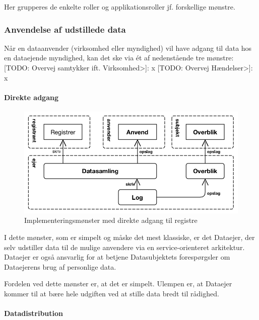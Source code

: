 Her grupperes de enkelte roller og applikationsroller jf. forskellige
mønstre.

\subsubsection{Anvendelse af udstillede
data}\label{anvendelse-af-udstillede-data}

Når en dataanvender (virksomhed eller myndighed) vil have adgang til
data hos en dataejende myndighed, kan det ske via ét af nedenstående tre
mønstre: {[}TODO: Overvej samtykker ift. Virksomhed\textgreater{}{]}: x
{[}TODO: Overvej Hændelser\textgreater{}{]}: x

\paragraph{Direkte adgang}\label{direkte-adgang}

\begin{figure}
\centering
\includegraphics[width=\textwidth]{figures/use-soa.png}
\caption{Implementeringsmønster med direkte adgang til registre}
\end{figure}

I dette mønster, som er simpelt og måske det mest klassiske, er det
Dataejer, der selv udstiller data til de mulige anvendere via en
service-orienteret arkitektur. Dataejer er også ansvarlig for at betjene
Datasubjektets forespørgsler om Dataejerens brug af personlige data.

Fordelen ved dette mønster er, at det er simpelt. Ulempen er, at
Dataejer kommer til at bære hele udgiften ved at stille data bredt til
rådighed.

\paragraph{Datadistribution}\label{datadistribution}

